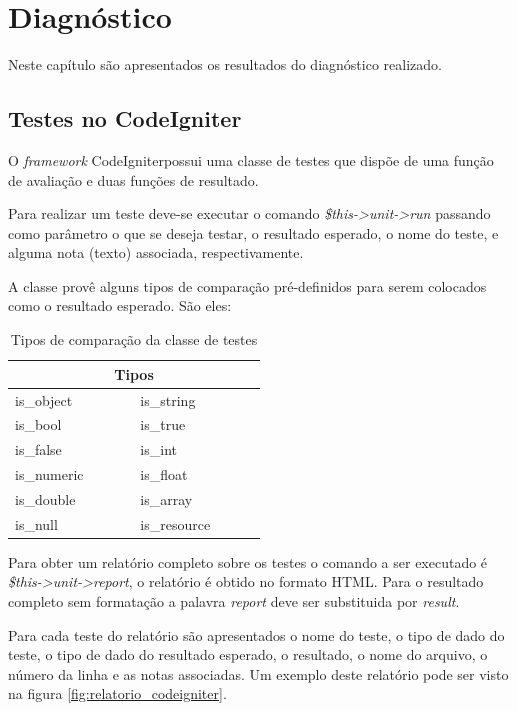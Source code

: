 \chapter{Diagnóstico}

Neste capítulo são apresentados os resultados do diagnóstico realizado.

    
\section{Testes no CodeIgniter}

O \textit{framework} CodeIgniter\footnotemark possui uma classe de testes que dispõe de uma função de avaliação
e duas funções de resultado. 

Para realizar um teste deve-se executar o comando \textit{\$this->unit->run} passando como parâmetro
o que se deseja testar, o resultado esperado, o nome do teste, e alguma nota (texto) associada, respectivamente.

A classe provê alguns tipos de comparação pré-definidos para serem colocados como o resultado esperado. São eles:

\begin{table}[!h]
\caption{Tipos de comparação da classe de testes}
\label{table:tipos_comparacao}
\centering
\begin{tabular}{|p{0.25\linewidth}|p{0.25\linewidth}|}
  \hline
  \multicolumn{2}{|c|}{\textbf{Tipos}} \\
  \hline			
	is\_object & is\_string \\
  \hline
	is\_bool &	is\_true \\
  \hline
	is\_false & is\_int \\
  \hline
	is\_numeric & is\_float \\
  \hline
	is\_double & is\_array \\
  \hline
	is\_null &	is\_resource \\
  \hline
  \end{tabular}
\end{table}

Para obter um relatório completo sobre os testes o comando a ser executado é \textit{\$this->unit->report}, 
o relatório é obtido no formato HTML. Para o resultado completo sem formatação a palavra \textit{report} deve ser
substituida por \textit{result}.

Para cada teste do relatório são apresentados o nome do teste, o tipo de dado do teste, o tipo de 
dado do resultado esperado, o resultado, o nome do arquivo, o número da linha e as notas associadas.
Um exemplo deste relatório pode ser visto na figura \ref{fig:relatorio_codeigniter}.

